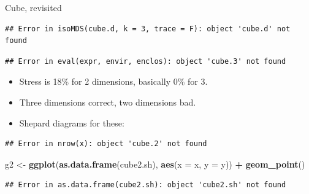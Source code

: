 \documentclass[ignorenonframetext,]{beamer}
\newenvironment{Shaded}{\begin{snugshade}}{\end{snugshade}}
\newcommand{\DataTypeTok}[1]{\textcolor[rgb]{0.13,0.29,0.53}{#1}}
\newcommand{\FloatTok}[1]{\textcolor[rgb]{0.00,0.00,0.81}{#1}}
\newcommand{\KeywordTok}[1]{\textcolor[rgb]{0.13,0.29,0.53}{\textbf{#1}}}
\newcommand{\NormalTok}[1]{#1}
\newcommand{\OperatorTok}[1]{\textcolor[rgb]{0.81,0.36,0.00}{\textbf{#1}}}
\newcommand{\StringTok}[1]{\textcolor[rgb]{0.31,0.60,0.02}{#1}}
\begin{document}
\begin{frame}[fragile]{Cube, revisited}
\begin{verbatim}
## Error in isoMDS(cube.d, k = 3, trace = F): object 'cube.d' not found
\end{verbatim}

\begin{Shaded}
\end{Shaded}

\begin{verbatim}
## Error in eval(expr, envir, enclos): object 'cube.3' not found
\end{verbatim}

\begin{itemize}
\item
  Stress is 18\% for 2 dimensions, basically 0\% for 3.
\item
  Three dimensions correct, two dimensions bad.
\item
  Shepard diagrams for these:
\end{itemize}

\begin{Shaded}
\end{Shaded}

\begin{verbatim}
## Error in nrow(x): object 'cube.2' not found
\end{verbatim}

\begin{Shaded}
\begin{Highlighting}[]
\NormalTok{g2 <-}\StringTok{ }\KeywordTok{ggplot}\NormalTok{(}\KeywordTok{as.data.frame}\NormalTok{(cube2.sh), }\KeywordTok{aes}\NormalTok{(}\DataTypeTok{x =}\NormalTok{ x, }\DataTypeTok{y =}\NormalTok{ y)) }\OperatorTok{+}
\StringTok{  }\KeywordTok{geom_point}\NormalTok{()}
\end{Highlighting}
\end{Shaded}

\begin{verbatim}
## Error in as.data.frame(cube2.sh): object 'cube2.sh' not found
\end{verbatim}

\begin{Shaded}
\end{Shaded}


\end{frame}
\end{document}

